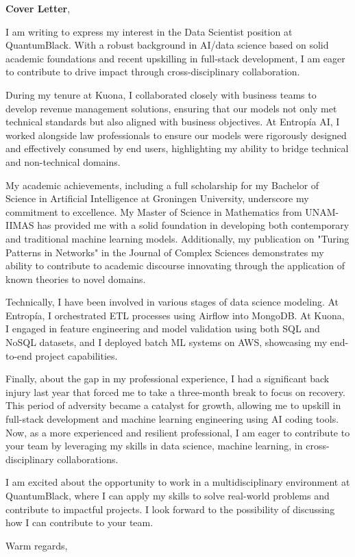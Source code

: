 \documentclass[11pt,a4paper,roman]{moderncv}
\begin{document}
\date{\today}
\opening{\textbf{Cover Letter}, \vspace{-1em}}

\makelettertitle

I am writing to express my interest in the Data Scientist position at QuantumBlack. 
With a robust background in AI/data science based on solid academic foundations and 
recent upskilling in full-stack development, 
I am eager to contribute to drive impact through cross-disciplinary collaboration.

During my tenure at Kuona, I collaborated closely with business teams to develop 
revenue management solutions, ensuring that our models not only met technical standards 
but also aligned with business objectives. At Entropía AI, I worked alongside law 
professionals to ensure our models were rigorously designed and effectively consumed 
by end users, highlighting my ability to bridge technical and non-technical domains.

My academic achievements, including a full scholarship for my Bachelor of Science in 
Artificial Intelligence at Groningen University, underscore my commitment to excellence. 
My Master of Science in Mathematics from UNAM-IIMAS has provided me with a solid foundation 
in developing both contemporary and traditional machine learning models. Additionally, 
my publication on "Turing Patterns in Networks" in the Journal of Complex Sciences 
demonstrates my ability to contribute to academic discourse innovating through the 
application of known theories to novel domains.

Technically, I have been involved in various stages of data science modeling. 
At Entropía, I orchestrated ETL processes using Airflow into MongoDB. 
At Kuona, I engaged in feature engineering and model validation using both SQL and 
NoSQL datasets, and I deployed batch ML systems on AWS, showcasing my end-to-end 
project capabilities.

Finally, about the gap in my professional experience, I had a significant back 
injury last year that forced me to take a three-month break to focus on recovery. 
This period of adversity became a catalyst for growth, allowing me to upskill 
in full-stack development and machine learning engineering using AI coding tools. 
Now, as a more experienced and resilient professional, I am eager to contribute 
to your team by leveraging my skills in data science, machine learning, 
in cross-disciplinary collaborations.

I am excited about the opportunity to work in a multidisciplinary environment at 
QuantumBlack, where I can apply my skills to solve real-world problems and 
contribute to impactful projects. I look forward to the possibility of discussing 
how I can contribute to your team.

Warm regards,

\makeletterclosing
\end{document}
